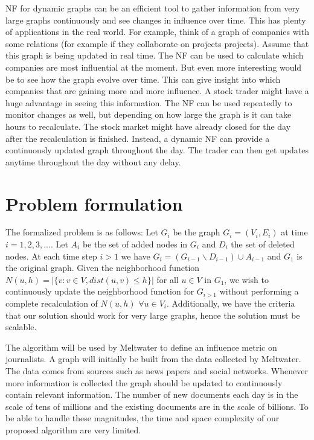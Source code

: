 NF for dynamic graphs can be an efficient tool to gather information from very large graphs continuously and see changes in influence over time. This has plenty of applications in the real world. For example, think of a graph of companies with some relations (for example if they collaborate on projects projects). Assume that this graph is being updated in real time. The NF can be used to calculate which companies are most influential at the moment. But even more interesting would be to see how the graph evolve over time. This can give insight into which companies that are gaining more and more influence. A stock trader might have a huge advantage in seeing this information. The NF can be used repeatedly to monitor changes as well, but depending on how large the graph is it can take hours to recalculate. The stock market might have already closed for the day after the recalculation is finished. Instead, a dynamic NF can provide a continuously updated graph throughout the day. The trader can then get updates anytime throughout the day without any delay.

\section{Problem formulation}
The formalized problem is as follows: 
Let $G_i$ be the graph $G_i = (V_i,E_i)$ at time $i = 1,2,3,...$.
Let $A_i$ be the set of added nodes in $G_i$ and $D_i$ the set of deleted nodes. 
At each time step $i > 1$ we have  $G_i = (G_{i-1} \backslash D_{i-1}) \cup A_{i-1}$ and $G_1$ is the original graph. Given the neighborhood function $N(u, h) = |\{v : v \in V, dist(u,v) \leq h \}|$ for all $u \in V$ in $G_1$, we wish to continuously update the neighborhood function for $G_{i>1}$ without performing a complete recalculation of $N(u, h)$ $\forall u \in V_i$. Additionally, we have the criteria that our solution should work for very large graphs, hence the solution must be scalable. 

The algorithm will be used by Meltwater to define an influence metric on journalists. A graph will initially be built from the data collected by Meltwater. The data comes from sources such as news papers and social networks. Whenever more information is collected the graph should be updated to continuously contain relevant information. The number of new documents each day is in the scale of tens of millions and the existing documents are in the scale of billions. To be able to handle these magnitudes, the time and space complexity of our proposed algorithm are very limited.

